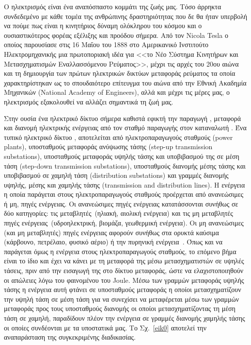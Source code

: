 \documentclass[12pt, a4paper, oneside]{report}
\begin{document}
Ο ηλεκτρισμός είναι ένα αναπόσπαστο κομμάτι της ζωής μας. Τόσο άρρηκτα συνδεδεμένο με κάθε τομέα της ανθρώπινης δραστηριότητας που δε θα ήταν υπερβολή να πούμε πως είναι η κινητήριος δύναμη ολόκληρου του κόσμου και ο ουσιαστικότερος φορέας εξέλιξης και προόδου σήμερα. Από τον Nicola Tesla ο οποίος παρουσίασε στις 16 Μαΐου του 1888 στο Αμερικανικό Ινστιτούτο Ηλεκτρομηχανικής μια πρωτοποριακή ιδέα για <<το Νέο Σύστημα Κινητήρων και Μετασχηματισμών Εναλλασσόμενου Ρεύματος>>, μέχρι τις αρχές του 20ου αιώνα και τη δημιουργία των πρώτων ηλεκτρικών δικτύων μεταφοράς ρεύματος τα οποία χαρακτηρίστηκαν ως το σπουδαιότερο επίτευγμα του αιώνα από την Εθνική Ακαδημία Μηχανικών (National Academy of Engineers), αλλά και μέχρι τις μέρες μας, ο ηλεκτρισμός εξακολουθεί να αλλάζει σημαντικά τη ζωή μας.

Στην ουσία ένα ηλεκτρικό δίκτυο σήμερα καθιστά εφικτή την παραγωγή , μεταφορά και διανομή ηλεκτρικής ενέργειας από τον σταθμό παραγωγής στον καταναλωτή \cite{4}. Ένα τυπικό ηλεκτρικό δίκτυο \cite{6}, αποτελείται από ηλεκτροπαραγωγούς σταθμούς (power plants), υποσταθμούς μεταφοράς ανύψωσης τάσης (step-up transmission substations), υποσταθμούς μεταφοράς υψηλής τάσης και υποβιβασμού της σε μέση τάση (step-down transmission substations), υποσταθμούς διανομής μέσης τάσης και υποβιβασμού σε χαμηλή τάση (distribution substations) και γραμμές διανομής υψηλής, μέσης και χαμηλής τάσης (transmission and distribution lines). Η ενέργεια η οποία παράγεται στους ηλεκτροπαραγωγούς σταθμούς προέρχεται από ανανεώσιμες ή μη, πηγές ενέργειας. Οι ανανεώσιμες πηγές ενέργειας κατατάσσονται συνήθως σε δύο κατηγορίες: τις μεταβλητές~(ηλιακή, αιολική ενέργεια) και τις μη μεταβλητές πηγές ενέργειας~(υδροηλεκτρική, βιομάζα, γεωθερμική ενέργεια). Οι μη ανανεώσιμες (και μη μεταβλητές) πηγές ενέργειας αφορούν συνήθως στα ορυκτά καύσιμα (κάρβουνο, πετρέλαιο, φυσικό αέριο) ή την πυρηνική ενέργεια~\cite{6}. Όπως και να παράγεται όμως η ενέργεια στους ηλεκτροπαραγωγούς σταθμούς, το επόμενο βήμα είναι το ίδιο και έχει να κάνει με τη μεταφορά της μέσω μετασχηματιστών σε υψηλές τάσεις, πριν από την εισαγωγή της στο δίκτυο μεταφοράς, ώστε να ελαχιστοποιηθούν οι απώλειες λόγω του φαινομένου του Joule. Μέσω των γραμμών μεταφοράς υψηλής τάσης η ενέργεια αυτή φτάνει σε υποσταθμούς μεταφοράς η οποίοι μετασχηματίζουν την υψηλή τάση σε μέση τάση για να συνεχίσει να μεταφέρεται μέσω των γραμμών μεταφοράς προς τους υποσταθμούς διανομής οι οποίοι μετασχηματίζοντας τη μέση τάση σε χαμηλή, παραδίδουν πλέον την ενέργεια σε γραμμές διανομής χαμηλής τάσης οι οποίες συνδέονται με τα υποστατικά μας. Το Σχ.~\ref{eik0} αποτελεί την αναπαράσταση της συγκεκριμένης διαδικασίας.
\end{document}
